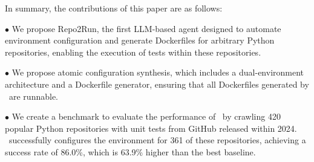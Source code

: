 In summary, the contributions of this paper are as follows:


$\bullet$ We propose Repo2Run, the first LLM-based agent designed to automate environment configuration and generate Dockerfiles for arbitrary Python repositories, enabling the execution of tests within these repositories.

$\bullet$ We propose atomic configuration synthesis, which includes a dual-environment architecture and a Dockerfile generator, ensuring that all Dockerfiles generated by \tool~are runnable.

$\bullet$ We create a benchmark to evaluate the performance of \tool~by crawling 420 popular Python repositories with unit tests from GitHub released within 2024. \tool~successfully configures the environment for 361 of these repositories, achieving a success rate of 86.0\%, which is 63.9\% higher than the best baseline.
